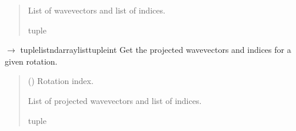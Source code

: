 \documentclass[letterpaper,10pt,english]{sphinxmanual}
\begin{document}
\begin{fulllineitems}
\begin{fulllineitems}
\begin{quote}
\begin{description}
\sphinxAtStartPar
List of wavevectors and list of indices.

\sphinxAtStartPar
tuple

\end{description}\end{quote}

\end{fulllineitems}


\begin{fulllineitems}
\label{\detokenize{source/Illumination:Illumination.Illumination.get_wavevectors_projected}}
\pysigstartsignatures
\pysiglinewithargsret
{}
{}
{{ $\rightarrow$ tuple\DUrole{p}{{[}}list\DUrole{p}{{[}}ndarray\DUrole{p}{{]}}list\DUrole{p}{{[}}tuple\DUrole{p}{{[}}int\DUrole{p}{{]}}\DUrole{p}{{]}}\DUrole{p}{{]}}}}
\pysigstopsignatures
\sphinxAtStartPar
Get the projected wavevectors and indices for a given rotation.
\begin{quote}\begin{description}
\sphinxAtStartPar
{} () \textendash{} Rotation index.

\sphinxAtStartPar
List of projected wavevectors and list of indices.

\sphinxAtStartPar
tuple

\end{description}\end{quote}

\end{fulllineitems}



\end{fulllineitems}
\end{document}

